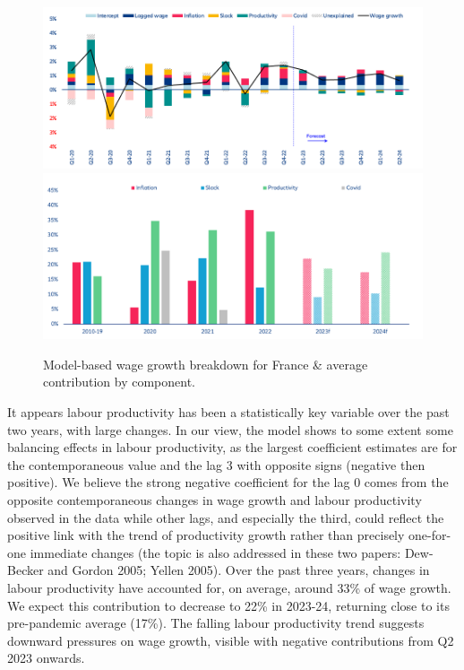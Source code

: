 \begin{figure}[H]
    \centering
    \caption{Model-based wage growth breakdown for France \& average contribution by component.}
    \includegraphics[width=.8\textwidth]{Core/2.Labour/img/Franceb1.png}
    \includegraphics[width=.8\textwidth]{Core/2.Labour/img/Franceb2.png}
    \label{figure:frbreakdown}
\end{figure}
 
It appears labour productivity has been a statistically key variable over the past two years, with large changes. 
In our view, the model shows to some extent some balancing effects in labour productivity, as the largest coefficient estimates are for the contemporaneous value and the lag 3 with opposite signs (negative then positive). 
We believe the strong negative coefficient for the lag 0 comes from the opposite contemporaneous changes in wage growth and labour productivity observed in the data while other lags, and especially the third, could reflect the positive link with the trend of productivity growth rather than precisely one-for-one immediate changes (the topic is also addressed in these two papers: Dew-Becker and Gordon 2005; Yellen 2005). 
Over the past three years, changes in labour productivity have accounted for, on average, around 33\% of wage growth. 
We expect this contribution to decrease to 22\% in 2023-24, returning close to its pre-pandemic average (17\%). 
The falling labour productivity trend suggests downward pressures on wage growth, visible with negative contributions from Q2 2023 onwards. 

